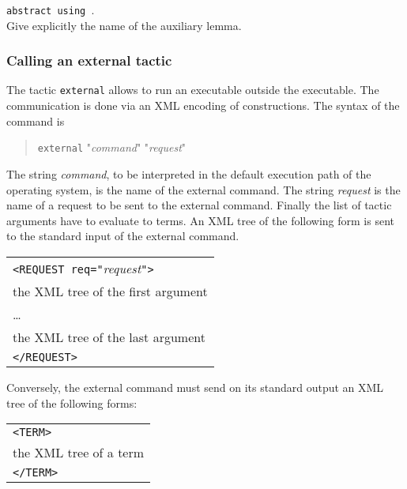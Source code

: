 \begin{Variants}
\item \texttt{abstract {\tacexpr} using {\ident}}.\\
  Give explicitly the name of the auxiliary lemma.
\end{Variants}

\ErrMsg {}

\subsubsection[Calling an external tactic]{Calling an external tactic}

The tactic {\tt external} allows to run an executable outside the
{\Coq} executable. The communication is done via an XML encoding of
constructions. The syntax of the command is

\begin{quote}
{\tt external} "\textsl{command}" "\textsl{request}" \nelist{\tacarg}{}
\end{quote}

The string \textsl{command}, to be interpreted in the default
execution path of the operating system, is the name of the external
command. The string \textsl{request} is the name of a request to be
sent to the external command. Finally the list of tactic arguments
have to evaluate to terms. An XML tree of the following form is sent
to the standard input of the external command.
\medskip

\begin{tabular}{l}
\texttt{<REQUEST req="}\textsl{request}\texttt{">}\\
the XML tree of the first argument\\
{\ldots}\\
the XML tree of the last argument\\
\texttt{</REQUEST>}\\
\end{tabular}
\medskip

Conversely, the external command must send on its standard output an
XML tree of the following forms:

\medskip
\begin{tabular}{l}
\texttt{<TERM>}\\
the XML tree of a term\\
\texttt{</TERM>}\\
\end{tabular}
\medskip

